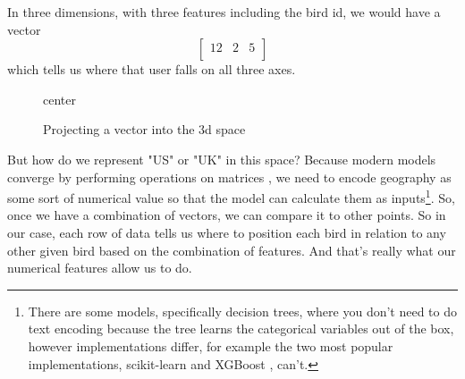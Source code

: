 \documentclass[11pt, table]{diazessay} %
\begin{document}
\begin{sloppypar}
In three dimensions, with three features including the bird id, we would have a vector
\begin{equation}
\begin{bmatrix}
12 & 2 & 5\\
\end{bmatrix}
\end{equation}
which tells us where that user falls on all three axes.

\begin{figure}[htbp]
\begin{adjustbox}{center}
\end{adjustbox}
\caption{Projecting a vector into the 3d space}
\label{fig:my_figure}
\end{figure}

But how do we represent "US" or "UK" in this space? Because modern models converge by performing operations on matrices  \citep{lakshmanan2020machine}, we need to encode geography as some sort of numerical value so that the model can calculate them as inputs\footnote{There are some models, specifically decision trees, where you don't need to do text encoding because the tree learns the categorical variables out of the box, however implementations differ, for example the two most popular implementations, scikit-learn and XGBoost \citep{altay_2020}, can't.}. So, once we have a combination of vectors, we can compare it to other points. So in our case, each row of data tells us where to position each bird in relation to any other given bird based on the combination of features.  And that's really what our numerical features allow us to do.



\end{sloppypar}
\end{document}

